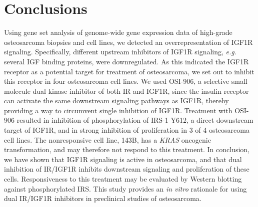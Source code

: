 \section{Conclusions}\label{conclusions5}
Using gene set analysis of genome\hyp{}wide gene expression data of high\hyp{}grade osteosarcoma biopsies and cell lines, we detected an overrepresentation of IGF1R signaling. Specifically, different upstream inhibitors of IGF1R signaling, {\it e.g.} several IGF binding proteins, were downregulated. As this indicated the IGF1R receptor as a potential target for treatment of osteosarcoma, we set out to inhibit this receptor in four osteosarcoma cell lines. We used OSI-906, a selective small molecule dual kinase inhibitor of both IR and IGF1R, since the insulin receptor can activate the same downstream signaling pathways as IGF1R, thereby providing a way to circumvent single inhibition of IGF1R. Treatment with OSI-906 resulted in inhibition of phosphorylation of IRS-1 Y612, a direct downstream target of IGF1R, and in strong inhibition of proliferation in 3 of 4 osteosarcoma cell lines. The nonresponsive cell line, 143B, has a {\it KRAS} oncogenic transformation, and may therefore not respond to this treatment. In conclusion, we have shown that IGF1R signaling is active in osteosarcoma, and that dual inhibition of IR/IGF1R inhibits downstream signaling and proliferation of these cells. Responsiveness to this treatment may be evaluated by Western blotting against phosphorylated IRS. This study provides an {\it in vitro} rationale for using dual IR/IGF1R inhibitors in preclinical studies of osteosarcoma.


\begin{small}
\begin{singlespace}

\end{singlespace}
\end{small}

%